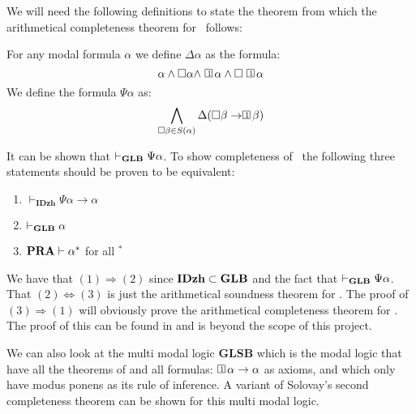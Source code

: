 \documentclass[../main.tex]{subfiles}
\begin{document}
We will need the following definitions to state the theorem from which the
arithmetical completeness theorem for \GLB\ follows:
\begin{defi}
	For any modal formula $\alpha$ we define $\Delta\alpha$ as the formula:
	\[\alpha\wedge\Box\alpha\wedge\OneBox\alpha\wedge\Box\OneBox\alpha\]
	We define the formula $\Psi\alpha$ as:
	\[\bigwedge_{\Box\beta\in
	S(\alpha)}\Delta(\Box\beta\rightarrow\OneBox\beta)\]
\end{defi}
It can be shown that $\vdash_{\text{\textbf{GLB}}}\Psi\alpha$.
To show completeness of \GLB\ the following three statements should be proven to
be equivalent:
\begin{enumerate}
	\item $\vdash_{\textbf{IDzh}}\Psi\alpha\rightarrow\alpha$
	\item $\vdash_{\text{\textbf{GLB}}}\alpha$
	\item $\text{\textbf{PRA}}\vdash\alpha^*$ for all $^*$
\end{enumerate}
We have that $(1)\Rightarrow (2)$ since $\text{\textbf{IDzh}}\subset\text{\textbf{GLB}}$ and the fact that
$\vdash_{\text{\textbf{GLB}}}\Psi\alpha$. That $(2)\Leftrightarrow(3)$ is just the arithmetical
soundness theorem for \GLB. The proof of $(3)\Rightarrow(1)$ will obviously
prove the arithmetical completeness theorem for \GLB.
The proof of this can be found in \parencite{Boolos1993} and is beyond the scope of
this project.

We can also look at the multi modal logic \textbf{GLSB} which is the modal logic that have all
the theorems of \GLB  and all formulas:
$\OneBox\alpha\rightarrow\alpha$ as axioms, and which only have modus ponens as
its rule of inference. A variant of Solovay's second completeness theorem can
be shown for this multi modal logic.
\end{document}
